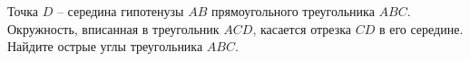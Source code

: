 \begin{ex}
	\begin{condition}
		Точка \( D \) – середина гипотенузы \( AB  \) прямоугольного треугольника \( ABC \). Окружность, вписанная в треугольник \( ACD \), касается отрезка \( CD  \) в его середине. Найдите острые углы треугольника \( ABC \).
	\end{condition}
\end{ex}